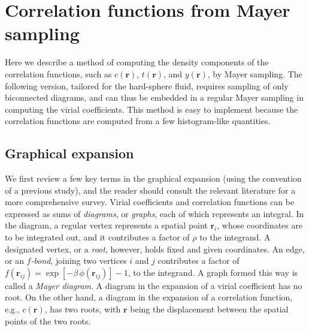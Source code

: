 \documentclass[aip,jcp,preprint,superscriptaddress,showpacs,preprintnumbers,amsmath,amssymb]{revtex4-1}
\numberwithin{equation}{section}
\newcommand{\vct}[1]{\mathbf{#1}}
\providecommand{\vr}{} %
\renewcommand{\vr}{\vct{r}}
\begin{document}
\section{\label{sec:cr_mayer}
Correlation functions from Mayer sampling}





Here we describe a method of computing the density components
of the correlation functions\cite{
perera2009, *dennison2009},
such as $c(\vr)$, $t(\vr)$, and $y(\vr)$,
by Mayer sampling\cite{
ree1966, rast1999, *labik2003, *kolafa2006, *kwak2005}.
%
The following version,
tailored for the hard-sphere fluid,
requires sampling of only biconnected diagrams,
and can thus be embedded in a regular Mayer sampling
in computing the virial coefficients\cite{zhang2014}.
%
This method is easy to implement
because the correlation functions
are computed from a few histogram-like quantities.




\subsection{\label{sec:cr_mayer_graphs}
Graphical expansion}




We first review a few key terms
in the graphical expansion
(using the convention of a previous study\cite{zhang2014}),
%
and the reader should consult
the relevant literature\cite{
uhlenbeck1962, hansen, ree1966, zhang2014,
morita1961III, *singh2004,
ree1964a, ree1964c, clisby2006, wheatley2013}
for a more comprehensive survey.
%
Virial coefficients and correlation functions
can be expressed as sums of \emph{diagrams}, or \emph{graphs},
each of which represents an integral.
%
In the diagram,
a regular vertex represents a spatial point $\vr_i$,
whose coordinates are to be integrated out,
and it contributes a factor of $\rho$ to the integrand.
%
A designated vertex,
or a \emph{root},
however, holds fixed and given coordinates.
%
An edge, or an \emph{$f$-bond},
joining two vertices $i$ and $j$
contributes a factor of
$f(\vr_{ij}) = \exp[-\beta \, \phi(\vr_{ij})] - 1$,
to the integrand.
%
A graph formed this way is called a \emph{Mayer diagram}.
%
A diagram in the expansion of a virial coefficient
has no root.
%
On the other hand,
a diagram in the expansion of a correlation function,
e.g., $c(\vr)$, has two roots,
with $\vr$ being the displacement between the spatial points
of the two roots.
\end{document}
